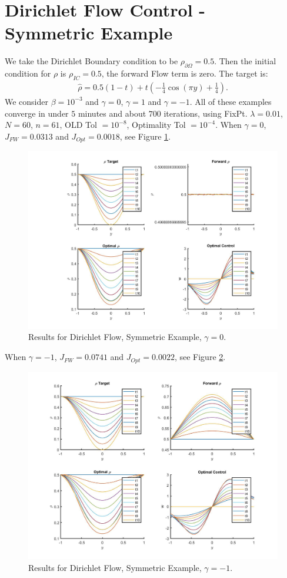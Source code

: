 \documentclass[11pt, a4paper]{article}
\theoremstyle{definition}
\begin{document}
\section{Dirichlet Flow Control - Symmetric Example}
We take the Dirichlet Boundary condition to be $\rho_{\partial \Omega} = 0.5$. Then the initial condition for $\rho$ is $\rho_{IC}=0.5$, the forward Flow term is zero. 
The target is:
\begin{align*}
\hat \rho = 0.5(1-t) + t(-\frac{1}{4}\cos(\pi y) + \frac{1}{4}).
\end{align*}
We consider $\beta = 10^{-3}$ and $\gamma = 0$, $\gamma = 1$ and $\gamma = -1$. All of these examples converge in under $5$ minutes and about $700$ iterations, using FixPt. $\lambda = 0.01$, $N= 60$, $n = 61$, OLD Tol $= 10^{-8}$, Optimality Tol $=10^{-4}$.
When $\gamma = 0$, $J_{FW} = 0.0313$ and $J_{Opt} = 0.0018$, see Figure \ref{Res02}.
\begin{figure}[h]
	\includegraphics[scale=0.3]{Res02.jpg}
	\caption{Results for Dirichlet Flow, Symmetric Example, $\gamma = 0$.}
	\label{Res02}
\end{figure}
When $\gamma = -1$, $J_{FW} = 0.0741$ and $J_{Opt} = 0.0022$, see Figure \ref{Resn12}.
\begin{figure}[h]
	\includegraphics[scale=0.3]{Resn12.jpg}
	\caption{Results for Dirichlet Flow, Symmetric Example, $\gamma = -1$.}
	\label{Resn12}
\end{figure}
\end{document}

